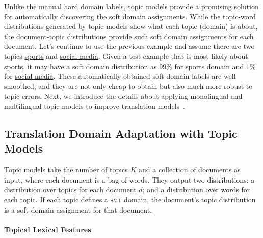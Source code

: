 Unlike the manual hard domain labels, topic models provide a promising solution for automatically discovering the soft domain assignments. While the topic-word distributions generated by topic models show what each topic (domain) is about, the document-topic distributions provide such soft domain assignments for each document. Let's continue to use the previous example and assume there are two topics \underline{sports} and \underline{social media}. Given a test example that is most likely about \underline{sports}, it may have a soft domain distribution as $99\%$ for \underline{sports} domain and $1\%$ for \underline{social media}. These automatically obtained soft domain labels are well smoothed, and they are not only cheap to obtain but also much more robust to topic errors. Next, we introduce the details about applying monolingual and multilingual topic models to improve translation models~\citep{Eidelman-12,hu-14}.


\subsection{Translation Domain Adaptation with Topic Models}

Topic models take the number of topics $K$ and a collection of documents as input, where each document is a bag of words. They output two distributions: a distribution over topics for each document $d$; and a distribution over words for each topic. If each topic defines a \textsc{smt} domain, the document's topic distribution is a soft domain assignment for that document.


\paragraph{Topical Lexical Features}

